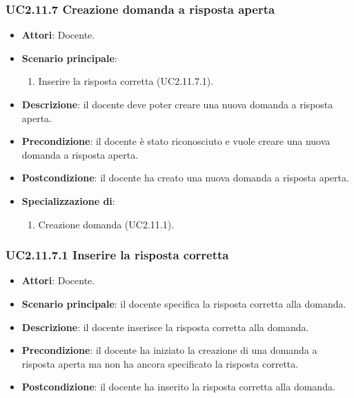 \subsubsection{UC2.11.7 Creazione domanda a risposta aperta}
\begin{itemize}
\item \textbf{Attori}: Docente.
\item \textbf{Scenario principale}:
\begin{enumerate}
\item Inserire la risposta corretta (UC2.11.7.1).
\end{enumerate}
\item \textbf{Descrizione}: il docente deve poter creare una nuova domanda a risposta aperta.
\item \textbf{Precondizione}: il docente è stato riconosciuto e vuole creare una nuova domanda a risposta aperta.
\item \textbf{Postcondizione}: il docente ha creato una nuova domanda a risposta aperta.
\item \textbf{Specializzazione di}:
\begin{enumerate}
\item Creazione domanda (UC2.11.1).
\end{enumerate}
\end{itemize}
\subsubsection{UC2.11.7.1 Inserire la risposta corretta}
\begin{itemize}
\item \textbf{Attori}: Docente.
\item \textbf{Scenario principale}: il docente specifica la risposta corretta alla domanda.
\item \textbf{Descrizione}: il docente inserisce la risposta corretta alla domanda.
\item \textbf{Precondizione}: il docente ha iniziato la creazione di una domanda a risposta aperta ma non ha ancora specificato la risposta corretta.
\item \textbf{Postcondizione}: il docente ha inserito la risposta corretta alla domanda.
\end{itemize}
